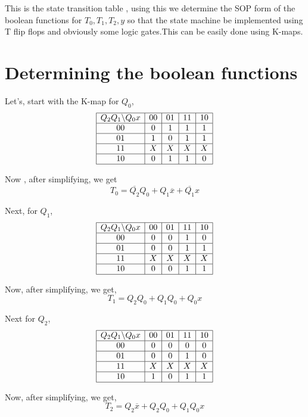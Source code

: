 \documentclass[a4paper,12pt]{article}
\begin{document}
This is the state transition table , using this we determine the SOP form of the boolean functions for $T_0,T_1,T_2,y$ so that the state machine be implemented using T flip flops and obviously some logic gates.This can be easily done using K-maps.

\section{Determining the boolean functions}

Let's, start with the K-map for $Q_0$,
\[
\begin{array}{|c|c|c|c|c|}
\hline
Q_2 Q_1 \backslash Q_0 x & 00 & 01 & 11 & 10 \\
\hline
00 & 0 & 1 & 1 & 1 \\
\hline
01 & 1 & 0 & 1 & 1 \\
\hline
11 & X & X & X & X \\
\hline
10 & 0 & 1 & 1 & 0 \\
\hline
\end{array}
\]

Now , after simplifying, we get
\[
\boxed{T_0 = \overline{Q_2}Q_0 + Q_1 \overline{x} + \overline{Q_1}x} 
\]

Next, for $Q_1$,
\[
\begin{array}{|c|c|c|c|c|}
\hline
Q_2 Q_1 \backslash Q_0 x & 00 & 01 & 11 & 10 \\
\hline
00 & 0 & 0 & 1 & 0 \\
\hline
01 & 0 & 0 & 1 & 1 \\
\hline
11 & X & X & X & X \\
\hline
10 & 0 & 0 & 1 & 1 \\
\hline
\end{array}
\]

Now, after simplifying, we get,
\[
\boxed{T_1 = Q_2Q_0 + Q_1 Q_0 + Q_0x} 
\]

Next for $Q_2$,
\[
\begin{array}{|c|c|c|c|c|}
\hline
Q_2 Q_1 \backslash Q_0 x & 00 & 01 & 11 & 10 \\
\hline
00 & 0 & 0 & 0 & 0 \\
\hline
01 & 0 & 0 & 1 & 0 \\
\hline
11 & X & X & X & X \\
\hline
10 & 1 & 0 & 1 & 1 \\
\hline
\end{array}
\]

Now, after simplifying, we get,
\[
\boxed{T_2 = Q_2\overline{x} + Q_2Q_0 + Q_1Q_0x}
\]
\end{document}
